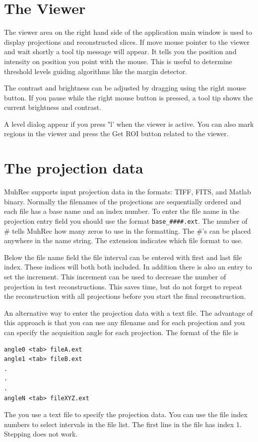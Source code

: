 \documentclass[a4paper]{scrreprt}
\begin{document}
\section{The Viewer}
The viewer area on the right hand side of the application main window is used to display projections and reconstructed slices. If move mouse pointer to the viewer and wait shortly a tool tip message will appear. It tells you the position and intensity on position you point with the mouse. This is useful to determine threshold levels guiding algorithms like the margin detector.

The contrast and brightness can be adjusted by dragging using the right mouse button. If you pause while the right mouse button is pressed, a tool tip shows the current brightness and contrast.

A level dialog appear if you press "l' when the viewer is active. You can also mark regions in the viewer and press the Get ROI button related to the viewer.  


\section{The projection data}
MuhRec supports input projection data in the formats: TIFF, FITS, and Matlab
binary. Normally the filenames of the projections are sequentially ordered and
each file has a base name and an index number. To enter the file name in the
projection entry field you should use the format \verb+base_####.ext+. The
number of \# tells MuhRec how many zeros to use in the formatting. The \#'s can
be placed anywhere in the name string. The extension indicates which file format
to use.

Below the file name field the file interval can be entered with first and last
file index. These indices will both both included. In addition there is also an
entry to set the increment. This increment can be used to decrease the number of
projection in test reconstructions. This saves time, but do not forget to repeat
the reconstruction with all projections before you start the final
reconstruction.

An alternative way to enter the projection data with a text file. The advantage
of this approach is that you can use any filename and for each projection and
you can specify the acquisition angle for each projection.
The format of the file is
\begin{verbatim}
angle0 <tab> fileA.ext
angle1 <tab> fileB.ext
.
.
.
angleN <tab> fileXYZ.ext
\end{verbatim}
The you use a text file to specify the projection data. You can use the file
index numbers to select intervals in the file list. The first line in the file
has index 1. Stepping does not work.
\end{document}
